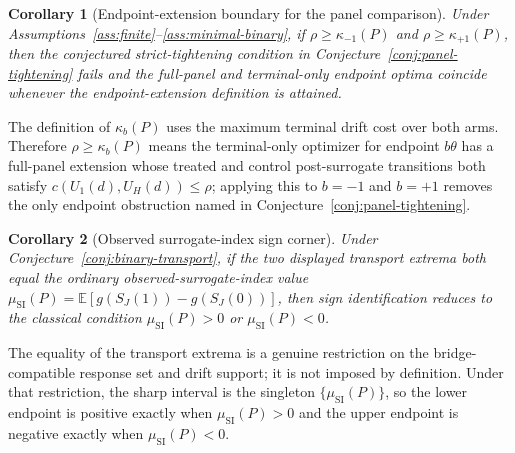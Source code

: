 \documentclass[11pt]{article}
\newcommand{\E}{\mathbb{E}}
\theoremstyle{definition}
\theoremstyle{plain}
\newtheorem{corollary}{Corollary}
\theoremstyle{remark}
\begin{document}
\begin{corollary}[Endpoint-extension boundary for the panel comparison]\label{cor:endpoint-extension}
Under Assumptions~\ref{ass:finite}--\ref{ass:minimal-binary}, if \(\rho\ge\kappa_{-1}(P)\) and \(\rho\ge\kappa_{+1}(P)\), then the conjectured strict-tightening condition in Conjecture~\ref{conj:panel-tightening} fails and the full-panel and terminal-only endpoint optima coincide whenever the endpoint-extension definition is attained.
\end{corollary}
The definition of \(\kappa_b(P)\) uses the maximum terminal drift cost over both arms.  Therefore \(\rho\ge\kappa_b(P)\) means the terminal-only optimizer for endpoint \(b\theta\) has a full-panel extension whose treated and control post-surrogate transitions both satisfy \(c(U_1(d),U_H(d))\le\rho\); applying this to \(b=-1\) and \(b=+1\) removes the only endpoint obstruction named in Conjecture~\ref{conj:panel-tightening}.

\begin{corollary}[Observed surrogate-index sign corner]\label{cor:sign-corner}
Under Conjecture~\ref{conj:binary-transport}, if the two displayed transport extrema both equal the ordinary observed-surrogate-index value \(\mu_{\mathrm{SI}}(P)=\E[g(S_J(1))-g(S_J(0))]\), then sign identification reduces to the classical condition \(\mu_{\mathrm{SI}}(P)>0\) or \(\mu_{\mathrm{SI}}(P)<0\).
\end{corollary}
The equality of the transport extrema is a genuine restriction on the bridge-compatible response set and drift support; it is not imposed by definition.  Under that restriction, the sharp interval is the singleton \(\{\mu_{\mathrm{SI}}(P)\}\), so the lower endpoint is positive exactly when \(\mu_{\mathrm{SI}}(P)>0\) and the upper endpoint is negative exactly when \(\mu_{\mathrm{SI}}(P)<0\).
\end{document}
